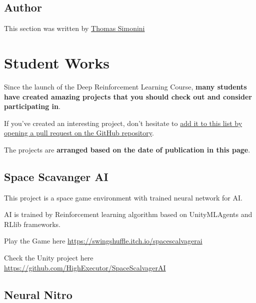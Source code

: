 \documentclass[11pt,a4paper]{article}
\begin{document}
\subsection{Author}\label{author-8}

This section was written by \href{https://twitter.com/ThomasSimonini}{Thomas Simonini}

\section{Student Works}\label{student-works}

Since the launch of the Deep Reinforcement Learning Course, \textbf{many students have created amazing projects that you should check out and consider participating in}.

If you've created an interesting project, don't hesitate to \href{https://github.com/huggingface/deep-rl-class}{add it to this list by opening a pull request on the GitHub repository}.

The projects are \textbf{arranged based on the date of publication in this page}.

\subsection{Space Scavanger AI}\label{space-scavanger-ai}

This project is a space game environment with trained neural network for AI.

AI is trained by Reinforcement learning algorithm based on UnityMLAgents and RLlib frameworks.


Play the Game here \url{https://swingshuffle.itch.io/spacescalvagerai}

Check the Unity project here \url{https://github.com/HighExecutor/SpaceScalvagerAI}

\subsection{Neural Nitro}\label{neural-nitro}

\end{document}
